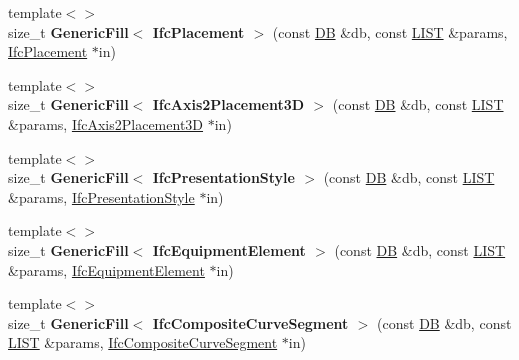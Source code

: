 \begin{DoxyCompactItemize}
\item 
\hypertarget{namespace_assimp_1_1_s_t_e_p_a294f3ece6f39f640dfbee28e2f9f06f6}{{\footnotesize template$<$$>$ }\\size\+\_\+t {\bfseries Generic\+Fill$<$ Ifc\+Placement $>$} (const \hyperlink{class_assimp_1_1_s_t_e_p_1_1_d_b}{D\+B} \&db, const \hyperlink{class_assimp_1_1_s_t_e_p_1_1_e_x_p_r_e_s_s_1_1_l_i_s_t}{L\+I\+S\+T} \&params, \hyperlink{struct_assimp_1_1_i_f_c_1_1_ifc_placement}{Ifc\+Placement} $\ast$in)}\label{namespace_assimp_1_1_s_t_e_p_a294f3ece6f39f640dfbee28e2f9f06f6}

\item 
\hypertarget{namespace_assimp_1_1_s_t_e_p_ab81389aef34d6e03058c3d7a999333a7}{{\footnotesize template$<$$>$ }\\size\+\_\+t {\bfseries Generic\+Fill$<$ Ifc\+Axis2\+Placement3\+D $>$} (const \hyperlink{class_assimp_1_1_s_t_e_p_1_1_d_b}{D\+B} \&db, const \hyperlink{class_assimp_1_1_s_t_e_p_1_1_e_x_p_r_e_s_s_1_1_l_i_s_t}{L\+I\+S\+T} \&params, \hyperlink{struct_assimp_1_1_i_f_c_1_1_ifc_axis2_placement3_d}{Ifc\+Axis2\+Placement3\+D} $\ast$in)}\label{namespace_assimp_1_1_s_t_e_p_ab81389aef34d6e03058c3d7a999333a7}

\item 
\hypertarget{namespace_assimp_1_1_s_t_e_p_a2bacc36900e3ecb17740f2d917f27f95}{{\footnotesize template$<$$>$ }\\size\+\_\+t {\bfseries Generic\+Fill$<$ Ifc\+Presentation\+Style $>$} (const \hyperlink{class_assimp_1_1_s_t_e_p_1_1_d_b}{D\+B} \&db, const \hyperlink{class_assimp_1_1_s_t_e_p_1_1_e_x_p_r_e_s_s_1_1_l_i_s_t}{L\+I\+S\+T} \&params, \hyperlink{struct_assimp_1_1_i_f_c_1_1_ifc_presentation_style}{Ifc\+Presentation\+Style} $\ast$in)}\label{namespace_assimp_1_1_s_t_e_p_a2bacc36900e3ecb17740f2d917f27f95}

\item 
\hypertarget{namespace_assimp_1_1_s_t_e_p_ab3f0f9af7445247336b88062b8b24c39}{{\footnotesize template$<$$>$ }\\size\+\_\+t {\bfseries Generic\+Fill$<$ Ifc\+Equipment\+Element $>$} (const \hyperlink{class_assimp_1_1_s_t_e_p_1_1_d_b}{D\+B} \&db, const \hyperlink{class_assimp_1_1_s_t_e_p_1_1_e_x_p_r_e_s_s_1_1_l_i_s_t}{L\+I\+S\+T} \&params, \hyperlink{struct_assimp_1_1_i_f_c_1_1_ifc_equipment_element}{Ifc\+Equipment\+Element} $\ast$in)}\label{namespace_assimp_1_1_s_t_e_p_ab3f0f9af7445247336b88062b8b24c39}

\item 
\hypertarget{namespace_assimp_1_1_s_t_e_p_a450fa39cec15c2daaee3ac7f31dffcfb}{{\footnotesize template$<$$>$ }\\size\+\_\+t {\bfseries Generic\+Fill$<$ Ifc\+Composite\+Curve\+Segment $>$} (const \hyperlink{class_assimp_1_1_s_t_e_p_1_1_d_b}{D\+B} \&db, const \hyperlink{class_assimp_1_1_s_t_e_p_1_1_e_x_p_r_e_s_s_1_1_l_i_s_t}{L\+I\+S\+T} \&params, \hyperlink{struct_assimp_1_1_i_f_c_1_1_ifc_composite_curve_segment}{Ifc\+Composite\+Curve\+Segment} $\ast$in)}\label{namespace_assimp_1_1_s_t_e_p_a450fa39cec15c2daaee3ac7f31dffcfb}


\end{DoxyCompactItemize}
